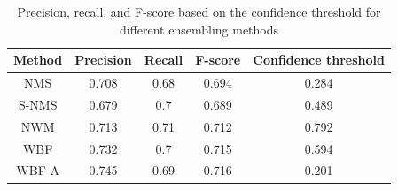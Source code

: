 \begin{table}[h]
    \begin{tabular}{|c|c|c|c|c|}
        \hline
        Method & Precision & Recall & F-score & Confidence threshold \\ \hline
        NMS    & 0.708     & 0.68   & 0.694   & 0.284                \\ \hline
        S-NMS  & 0.679     & 0.7    & 0.689   & 0.489                \\ \hline
        NWM    & 0.713     & 0.71   & 0.712   & 0.792                \\ \hline
        WBF    & 0.732     & 0.7    & 0.715   & 0.594                \\ \hline
        WBF-A  & 0.745     & 0.69   & 0.716   & 0.201                \\ \hline
    \end{tabular}
    \caption{Precision, recall, and F-score based on the confidence threshold for different ensembling methods}
    \label{tab:ensembling_prf:grid_search}
\end{table}

